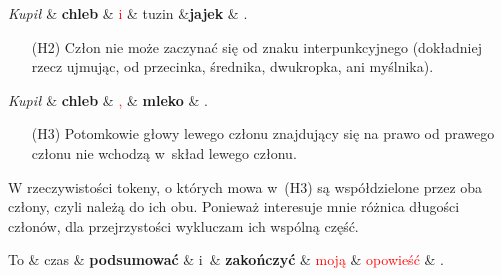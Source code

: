 \begin{exe}
\ex  \label{H1-przykład}
\begin{dependency}[baseline=-\the\dimexpr\fontdimen22\textfont2\relax]
\begin{deptext}[column sep=1em, row sep=.1ex]
\emph{Kupił} \& \textbf{chleb} \& \textcolor{red}{i} \& tuzin \&\textbf{jajek} \& .  \\ 
\end{deptext}
\end{dependency}
\end{exe}

\begin{enumerate}
\item[(H2)] Człon nie może zaczynać się od znaku interpunkcyjnego (dokładniej rzecz ujmując, od przecinka, średnika, dwukropka, ani myślnika).
\end{enumerate}

\begin{exe}
\ex  \label{H2-przykład}
\begin{dependency}[baseline=-\the\dimexpr\fontdimen22\textfont2\relax]
\begin{deptext}[column sep=1em]
\emph{Kupił} \& \textbf{chleb} \& \textcolor{red}{,} \& \textbf{mleko} \& .  \\ 
\end{deptext}
\end{dependency}
\end{exe}

\begin{enumerate}
\item[(H3)] Potomkowie głowy lewego członu znajdujący się na prawo od prawego członu nie wchodzą w~skład lewego członu.
\end{enumerate}

W rzeczywistości tokeny, o których mowa w~(H3) są współdzielone przez oba człony, czyli należą do ich obu. Ponieważ interesuje mnie różnica długości członów, dla przejrzystości wykluczam ich wspólną część.

\begin{exe}
\ex \label{H3-przykład}
\begin{dependency}[baseline=-\the\dimexpr\fontdimen22\textfont2\relax]
\begin{deptext}[column sep=1em]
To \& czas \& \textbf{podsumować} \& i~\& \textbf{zakończyć} \& \textcolor{red}{moją} \& \textcolor{red}{opowieść} \& .  \\ 
\end{deptext}
\end{dependency}
\end{exe}

